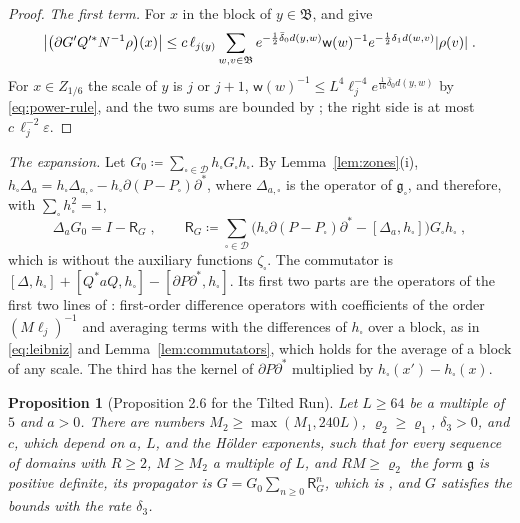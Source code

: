\documentclass[11pt]{preprint}
\DeclarePairedDelimiter{\abs}{\lvert}{\rvert}
\numberwithin{equation}{section}
\newtheorem{proposition}[theorem]{Proposition}
\theoremstyle{definition}
\theoremstyle{remark}
\theoremstyle{plain}
\begin{document}
\begin{proof}
\emph{The first term.} For $x$ in the block of $y \in \mathfrak B$, \cite[(2.67)]{BalabanPRT2} and \cite[(2.87)]{BalabanPRT2} give
\begin{equation}\label{eq:projection-first-term}
    \bigl\lvert\bigl(\partial G'Q'^*N^{-1}\rho\bigr)(x)\bigr\rvert \leq c\,\ell_{j(y)}\sum_{w, v \in \mathfrak B}e^{-\frac12\bar\delta_0d(y, w)}\mathsf w(w)^{-1}e^{-\frac12\delta_1d(w, v)}\abs{\rho(v)}\;.
\end{equation}
For $x \in Z_{1/6}$ the scale of $y$ is $j$ or $j + 1$, $\mathsf w(w)^{-1} \leq L^4\ell_j^{-4}e^{\frac{1}{16}\bar\delta_0d(y, w)}$ by \eqref{eq:power-rule}, and the two sums are bounded by \cite[(2.61)]{BalabanPRT2}; the right side is at most $c\,\ell_j^{-2}\varepsilon$.
\end{proof}

\emph{The expansion.} Let $G_0 \coloneqq \sum_{\square \in \mathscr D}h_\square G_\square h_\square$. By Lemma~\ref{lem:zones}(i), $h_\square\Delta_a = h_\square\Delta_{a,\square} - h_\square\partial(P - P_\square)\partial^*$, where $\Delta_{a,\square}$ is the operator of $\mathfrak g_\square$, and therefore, with $\sum_\square h_\square^2 = 1$,
\begin{equation}\label{eq:sequence-expansion}
    \Delta_aG_0 = I - \mathsf R_G\;,
    \qquad
    \mathsf R_G \coloneqq \sum_{\square \in \mathscr D}\bigl(h_\square\partial(P - P_\square)\partial^* - [\Delta_a, h_\square]\bigr)G_\square h_\square\;,
\end{equation}
which is \cite[(2.91)--(2.93)]{BalabanPRT2} without the auxiliary functions $\zeta_\square$. The commutator is $[\Delta, h_\square] + [Q^*aQ, h_\square] - [\partial P\partial^*, h_\square]$. Its first two parts are the operators of the first two lines of \cite[(2.92)]{BalabanPRT2}: first-order difference operators with coefficients of the order $(M\ell_j)^{-1}$ and averaging terms with the differences of $h_\square$ over a block, as in \eqref{eq:leibniz} and Lemma~\ref{lem:commutators}, which holds for the average of a block of any scale. The third has the kernel of $\partial P\partial^*$ multiplied by $h_\square(x') - h_\square(x)$.

\begin{proposition}[Proposition 2.6 for the Tilted Run]\label{prop:sequence-propagator}
Let $L \geq 64$ be a multiple of $5$ and $a > 0$. There are numbers $M_2 \geq \max(M_1, 240L)$, $\varrho_2 \geq \varrho_1$, $\delta_3 > 0$, and $c$, which depend on $a$, $L$, and the H\"older exponents, such that for every sequence of domains with $R \geq 2$, $M \geq M_2$ a multiple of $L$, and $RM \geq \varrho_2$ the form $\mathfrak g$ is positive definite, its propagator is $G = G_0\sum_{n \geq 0}\mathsf R_G^n$, which is \cite[(2.141)]{BalabanPRT2}, and $G$ satisfies the bounds \cite[(2.136)--(2.140), p.~247]{BalabanPRT2} with the rate $\delta_3$.
\end{proposition}
\end{document}
